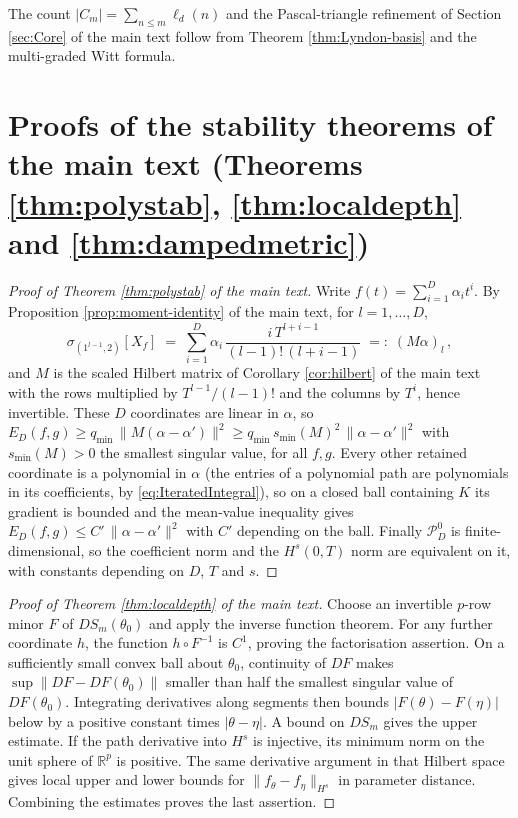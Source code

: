 \documentclass[11pt,english]{article}
\theoremstyle{definition}
\theoremstyle{remark}
\begin{document}
The count $|C_{m}|=\sum_{n\leq m}\ell_{d}(n)$ and the Pascal-triangle
refinement of Section \ref{sec:Core} of the main text follow from Theorem
\ref{thm:Lyndon-basis} and the multi-graded Witt formula.

\section{Proofs of the stability theorems of the main text (Theorems \ref{thm:polystab}, \ref{thm:localdepth} and \ref{thm:dampedmetric})}

\begin{proof}[Proof of Theorem \ref{thm:polystab} of the main text]
Write $f(t)=\sum_{i=1}^{D}\alpha_{i}t^{i}$. By Proposition
\ref{prop:moment-identity} of the main text, for $l=1,\ldots,D$,
\[
\sigma_{(1^{l-1},2)}[X_{f}]\;=\;\sum_{i=1}^{D}\alpha_{i}\,\frac{i\,T^{l+i-1}}{(l-1)!\,(l+i-1)}\;=:\;(M\alpha)_{l}\,,
\]
and $M$ is the scaled Hilbert matrix of Corollary \ref{cor:hilbert} of the main text
with the rows multiplied by $T^{l-1}/(l-1)!$ and the columns by $T^{i}$,
hence invertible. These $D$ coordinates are linear in $\alpha$, so
$E_{D}(f,g)\geq q_{\min}\,\|M(\alpha-\alpha')\|^{2}\geq q_{\min}\,s_{\min}(M)^{2}\,\|\alpha-\alpha'\|^{2}$
with $s_{\min}(M)>0$ the smallest singular value, for all $f,g$. Every
other retained coordinate is a polynomial in $\alpha$ (the entries of a
polynomial path are polynomials in its coefficients, by
\eqref{eq:IteratedIntegral}), so on a closed ball containing $K$ its
gradient is bounded and the mean-value inequality gives
$E_{D}(f,g)\leq C'\,\|\alpha-\alpha'\|^{2}$ with $C'$ depending on the
ball. Finally $\mathcal{P}_{D}^{0}$ is finite-dimensional, so the
coefficient norm and the $H^{s}(0,T)$ norm are equivalent on it, with
constants depending on $D$, $T$ and $s$.
\end{proof}

\begin{proof}[Proof of Theorem \ref{thm:localdepth} of the main text]
Choose an invertible $p$-row minor $F$ of $DS_m(\theta_0)$ and apply
the inverse function theorem. For any further coordinate $h$, the
function $h\circ F^{-1}$ is $C^1$, proving the factorisation assertion.
On a sufficiently small convex ball about $\theta_0$, continuity of
$DF$ makes $\sup\|DF-DF(\theta_0)\|$ smaller than half the smallest
singular value of $DF(\theta_0)$. Integrating derivatives along
segments then bounds $|F(\theta)-F(\eta)|$ below by a positive
constant times $|\theta-\eta|$. A bound on $DS_m$ gives the upper
estimate. If the path derivative into $H^s$ is injective, its minimum
norm on the unit sphere of $\mathbb R^p$ is positive. The same
derivative argument in that Hilbert space gives local upper and
lower bounds for $\|f_\theta-f_\eta\|_{H^s}$ in parameter distance.
Combining the estimates proves the last assertion.
\end{proof}
\end{document}
